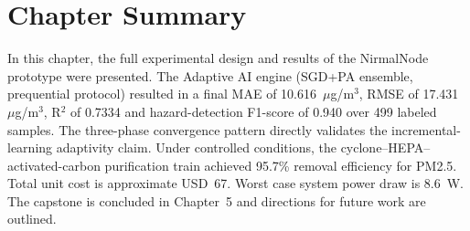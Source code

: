 \section{Chapter Summary}
\label{sec:exp-summary}

In this chapter, the full experimental design and results of the NirmalNode prototype were presented. The Adaptive AI engine (SGD+PA ensemble, prequential protocol) resulted in a final MAE of 10.616~$\mu$g/m$^3$, RMSE of 17.431~$\mu$g/m$^3$, R$^2$ of 0.7334 and hazard-detection F1-score of 0.940 over 499 labeled samples. The three-phase convergence pattern directly validates the incremental-learning adaptivity claim. Under controlled conditions, the cyclone--HEPA--activated-carbon purification train achieved 95.7\% removal efficiency for PM2.5. Total unit cost is approximate USD~67. Worst case system power draw is 8.6~W. The capstone is concluded in Chapter~5 and directions for future work are outlined.